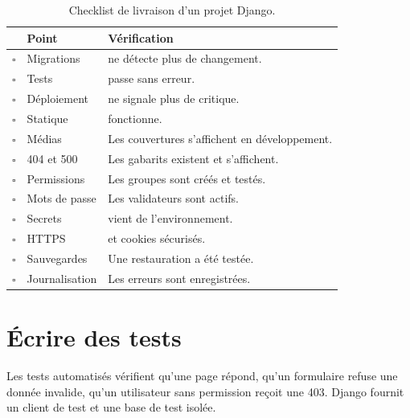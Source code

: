 \begin{table}[htbp]
\centering
\small
\begin{tabularx}{\textwidth}{C{1cm} L{5.1cm} X}
\toprule
\textbf{ } & \textbf{Point} & \textbf{Vérification} \\
\midrule
$\square$ & Migrations &  ne détecte plus de changement. \\
$\square$ & Tests &  passe sans erreur. \\
$\square$ & Déploiement &  ne signale plus de critique. \\
$\square$ & Statique &  fonctionne. \\
$\square$ & Médias & Les couvertures s'affichent en développement. \\
$\square$ & 404 et 500 & Les gabarits existent et s'affichent. \\
$\square$ & Permissions & Les groupes sont créés et testés. \\
$\square$ & Mots de passe & Les validateurs sont actifs. \\
$\square$ & Secrets &  vient de l'environnement. \\
$\square$ & HTTPS &  et cookies sécurisés. \\
$\square$ & Sauvegardes & Une restauration a été testée. \\
$\square$ & Journalisation & Les erreurs sont enregistrées. \\
\bottomrule
\end{tabularx}
\caption{Checklist de livraison d'un projet Django.}
\end{table}

\section{Écrire des tests}

Les tests automatisés vérifient qu'une page répond, qu'un formulaire refuse une
donnée invalide, qu'un utilisateur sans permission reçoit une 403. Django fournit
un client de test et une base de test isolée.

